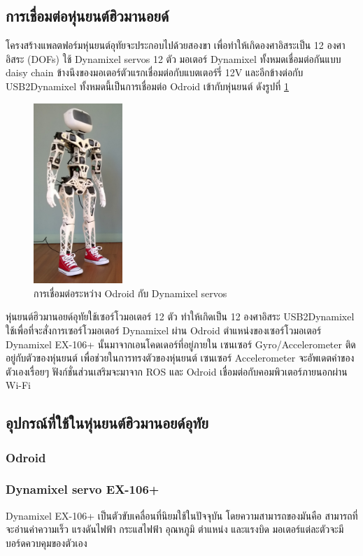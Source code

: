 \subsection{การเชื่อมต่อหุ่นยนต์ฮิวมานอยด์}
โครงสร้างแพลตฟอร์มหุ่นยนต์อุทัยจะประกอบไปด้วยสองขา เพื่อทำให้เกิดองศาอิสระเป็น 12 องศาอิสระ
(DOFs) ใช้ Dynamixel servos 12 ตัว มอเตอร์ Dynamixel ทั้งหมดเชื่อมต่อกันแบบ daisy chain
ข้างนึงของมอเตอร์ตัวแรกเชื่อมต่อกับแบตเตอร์รี่ 12V และอีกข้างต่อกับ USB2Dynamixel
ทั้งหมดนี้เป็นการเชื่อมต่อ Odroid เข้ากับหุ่นยนต์ ดังรูปที่ \ref{fig:odroid2dynamixel}

\begin{figure}[htbp]
    \centering
    \includegraphics[width=0.3\textwidth]{chapter2/images/PoppyHumanoid1.png}
    \caption{การเชื่อมต่อระหว่าง Odroid กับ Dynamixel servos}
    \label{fig:odroid2dynamixel}
\end{figure}

หุ่นยนต์ฮิวมานอยด์อุทัยใช้เซอร์โวมอเตอร์ 12 ตัว ทำให้เกิดเป็น 12 องศาอิสระ
USB2Dynamixel ใช้เพื่อที่จะสั่งการเซอร์โวมอเตอร์ Dynamixel ผ่าน Odroid
ตำแหน่งของเซอร์โวมอเตอร์ Dynamixel EX-106+ นั้นมาจากเอนโคดเดอร์ที่อยู่ภายใน
เซนเซอร์ Gyro/Accelerometer ติดอยู่กับตัวของหุ่นยนต์ เพื่อช่วยในการทรงตัวของหุ่นยนต์
เซนเซอร์ Accelerometer จะอัพเดตค่าของตัวเองเรื่อยๆ ฟังก์ชั่นส่วนเสริมจะมาจาก ROS
และ Odroid เชื่อมต่อกับคอมพิวเตอร์ภายนอกผ่าน Wi-Fi

\subsection{อุปกรณ์ที่ใช้ในหุ่นยนต์ฮิวมานอยด์อุทัย}
\subsubsection*{Odroid}
\subsubsection*{Dynamixel servo EX-106+}
Dynamixel EX-106+ เป็นตัวขับเคลื่อนที่นิยมใช้ในปัจจุบัน โดยความสามารถของมันคือ สามารถที่จะอ่านค่าความเร็ว
แรงดันไฟฟ้า กระแสไฟฟ้า อุณหภูมิ ตำแหน่ง และแรงบิด มอเตอร์แต่ละตัวจะมีบอร์ดควบคุมของตัวเอง

